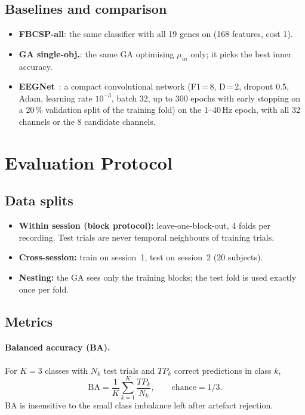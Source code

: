 \documentclass[11pt,a4paper]{article}
\newcommand{\gas}{GA single-obj.}
\newcommand{\fb}{FBCSP-all}
\begin{document}
\subsection{Baselines and comparison}
\begin{itemize}
  \item \textbf{\fb}: the same classifier with all 19 genes on (168 features, cost 1).
  \item \textbf{\gas}: the same GA optimising $\mu_{in}$ only; it picks the best inner accuracy.
  \item \textbf{EEGNet}~\cite{lawhern2018}: a compact convolutional network (F1\,=\,8, D\,=\,2,
        dropout 0.5, Adam, learning rate $10^{-3}$, batch 32, up to 300 epochs with early stopping on a
        20\,\% validation split of the training fold) on the 1--40\,Hz epoch, with all 32 channels or
        the 8 candidate channels.
\end{itemize}

\section{Evaluation Protocol}

\subsection{Data splits}
\begin{itemize}
  \item \textbf{Within session (block protocol):} leave-one-block-out, 4 folds per recording. Test
        trials are never temporal neighbours of training trials.
  \item \textbf{Cross-session:} train on session~1, test on session~2 (20 subjects).
  \item \textbf{Nesting:} the GA sees only the training blocks; the test fold is used exactly once per
        fold.
\end{itemize}

\subsection{Metrics}
\paragraph{Balanced accuracy (BA).} For $K=3$ classes with $N_k$ test trials and $TP_k$ correct
predictions in class $k$,
\begin{equation}
  \mathrm{BA}=\frac{1}{K}\sum_{k=1}^{K}\frac{TP_k}{N_k},\qquad \text{chance}=1/3.
\end{equation}
BA is insensitive to the small class imbalance left after artefact rejection.
\end{document}
